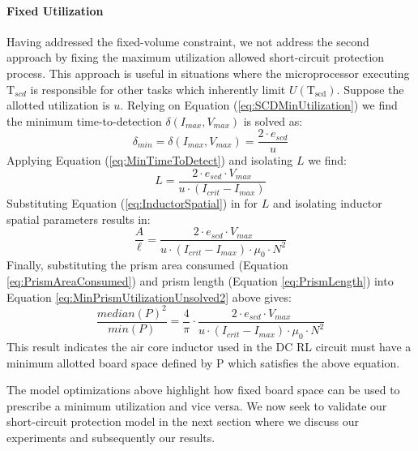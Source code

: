 \paragraph{Fixed Utilization}
Having addressed the fixed-volume constraint, we not address the second approach by fixing the maximum utilization allowed short-circuit protection process.
This approach is useful in situations where the microprocessor executing $\mathrm{T}_{scd}$ is responsible for other tasks which inherently limit $U(\mathrm{T_{scd}})$. Suppose the allotted utilization is $u$. Relying on Equation (\ref{eq:SCDMinUtilization}) we find the minimum time-to-detection $\delta(I_{max},V_{max})$ is solved as:
\begin{equation}\label{eq:MinTimeToDetectSpatial}
\delta_{min} = \delta(I_{max},V_{max}) = \frac{2 \cdot e_{scd}}{u} \nonumber
\end{equation}
Applying Equation (\ref{eq:MinTimeToDetect}) and isolating $L$ we find:
\begin{equation}\label{eq:InductorFixedUtilization}
L = \frac{2 \cdot e_{scd} \cdot V_{max}}{u \cdot (I_{crit}-I_{max})} \nonumber
\end{equation}
Substituting Equation (\ref{eq:InductorSpatial}) in for $L$ 
and isolating inductor spatial parameters results in:
\begin{equation}\label{eq:MinPrismUtilizationUnsolved2}
\frac{A}{\ell} = \frac{2 \cdot e_{scd} \cdot V_{max}}{u \cdot (I_{crit}-I_{max}) \cdot \mu_0 \cdot N^{2}} \nonumber
\end{equation}
Finally, substituting the prism area consumed (Equation \ref{eq:PrismAreaConsumed}) and prism length (Equation \ref{eq:PrismLength}) into Equation \ref{eq:MinPrismUtilizationUnsolved2} above gives:
\begin{equation}\label{eq:MinPrismUtilization}
\frac{median(P)^{2}}{min(P)} = \frac{4}{\pi} \cdot \frac{ 2 \cdot e_{scd} \cdot V_{max}}{u \cdot (I_{crit}-I_{max}) \cdot \mu_0 \cdot N^{2}}
\end{equation}
This result indicates the air core inductor used in the DC RL circuit must have a minimum allotted board space defined by P which satisfies the above equation.

The model optimizations above highlight how fixed board space can be used to prescribe a minimum utilization and vice versa.
We now seek to validate our short-circuit protection model in the next section where we discuss our experiments and subsequently our results.

